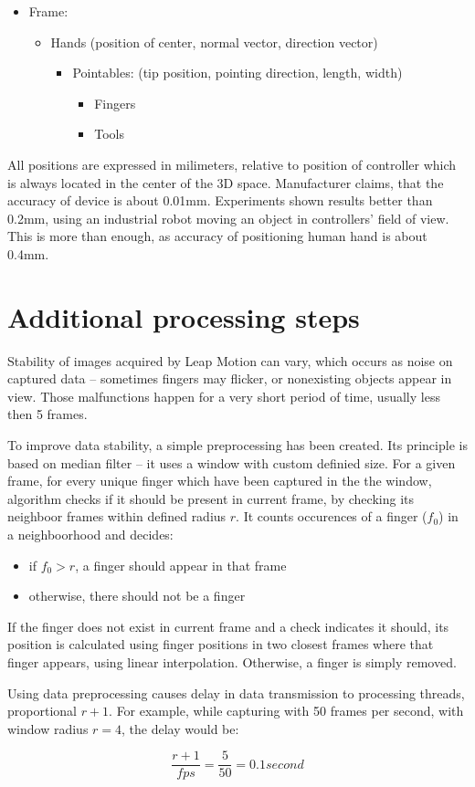 \begin{itemize}
	\item Frame:
	\begin{itemize}
		\item Hands (position of center, normal vector, direction vector)
			\begin{itemize}
				\item Pointables: (tip position, pointing direction, length, width)
				\begin{itemize}
					\item Fingers
					\item Tools
				\end{itemize}
			\end{itemize}
	\end{itemize}
\end{itemize}

All positions are expressed in milimeters, relative to position of controller which is always located in the center of the 3D space. Manufacturer claims, that the accuracy of device is about 0.01mm. Experiments shown results better than 0.2mm, using an industrial robot moving an object in controllers' field of view. This is more than enough, as accuracy of positioning human hand is about 0.4mm. \cite{lmAN} 

\section{Additional processing steps} \label{PreprocessingSection}

Stability of images acquired by Leap Motion can vary, which occurs as noise on captured data -- sometimes fingers may flicker, or nonexisting objects appear in view. Those malfunctions happen for a very short period of time, usually less then 5 frames. 

To improve data stability, a simple preprocessing has been created. Its principle is based on median filter -- it uses a window with custom definied size. For a given frame, for every unique finger which have been captured in the the window, algorithm checks if it should be present in current frame, by checking its neighboor frames within defined radius $r$. It counts occurences of a finger ($f_0$) in a neighboorhood and decides:

\begin{itemize}
\item if $f_0 > r$, a finger should appear in that frame
\item otherwise, there should not be a finger
\end{itemize}

If the finger does not exist in current frame and a check indicates it should, its position is calculated using finger positions in two closest frames where that finger appears, using linear interpolation. Otherwise, a finger is simply removed.

Using data preprocessing causes delay in data transmission to processing threads, proportional $r+1$. For example, while capturing with 50 frames per second, with window radius $r=4$, the delay would be:

$$ \frac{r+1}{fps} = \frac{5}{50} = 0.1 second $$

